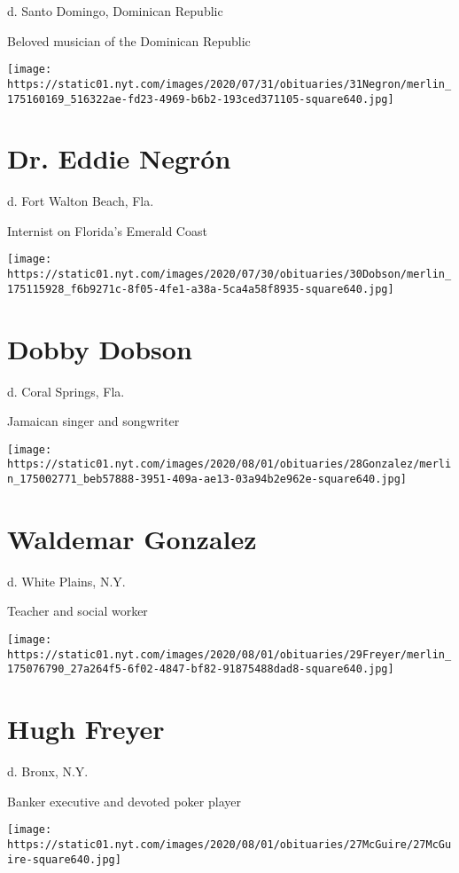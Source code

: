 d. Santo Domingo, Dominican Republic

Beloved musician of the Dominican Republic

\texttt{[image: https://static01.nyt.com/images/2020/07/31/obituaries/31Negron/merlin\_175160169\_516322ae-fd23-4969-b6b2-193ced371105-square640.jpg]}

\hypertarget{dr-eddie-negruxf3n}{%
\section{Dr. Eddie Negrón}\label{dr-eddie-negruxf3n}}

d. Fort Walton Beach, Fla.

Internist on Florida's Emerald Coast

\texttt{[image: https://static01.nyt.com/images/2020/07/30/obituaries/30Dobson/merlin\_175115928\_f6b9271c-8f05-4fe1-a38a-5ca4a58f8935-square640.jpg]}

\hypertarget{dobby-dobson}{%
\section{Dobby Dobson}\label{dobby-dobson}}

d. Coral Springs, Fla.

Jamaican singer and songwriter

\texttt{[image: https://static01.nyt.com/images/2020/08/01/obituaries/28Gonzalez/merlin\_175002771\_beb57888-3951-409a-ae13-03a94b2e962e-square640.jpg]}

\hypertarget{waldemar-gonzalez}{%
\section{Waldemar Gonzalez}\label{waldemar-gonzalez}}

d. White Plains, N.Y.

Teacher and social worker

\texttt{[image: https://static01.nyt.com/images/2020/08/01/obituaries/29Freyer/merlin\_175076790\_27a264f5-6f02-4847-bf82-91875488dad8-square640.jpg]}

\hypertarget{hugh-freyer}{%
\section{Hugh Freyer}\label{hugh-freyer}}

d. Bronx, N.Y.

Banker executive and devoted poker player

\texttt{[image: https://static01.nyt.com/images/2020/08/01/obituaries/27McGuire/27McGuire-square640.jpg]}

